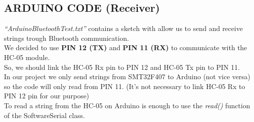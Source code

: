\subsection{ARDUINO CODE (Receiver)}
\textit{“ArduinoBluetoothTest.txt”} contains a sketch with allow us to send and receive strings trough Bluetooth communication.\\
We decided to use \textbf{PIN 12 (TX)} and \textbf{PIN 11 (RX)} to communicate with the HC-05 module.\\
So, we should link the HC-05 Rx pin to PIN 12 and HC-05 Tx pin to PIN 11.\\
In our project we only send strings from SMT32F407 to Arduino (not vice versa) so the code will only read from PIN 11. (It’s not necessary to link HC-05 Rx to PIN 12 pin for our purpose)\\
To read a string from the HC-05 on Arduino is enough to use the \textit{read()} function of the SoftwareSerial class.\\